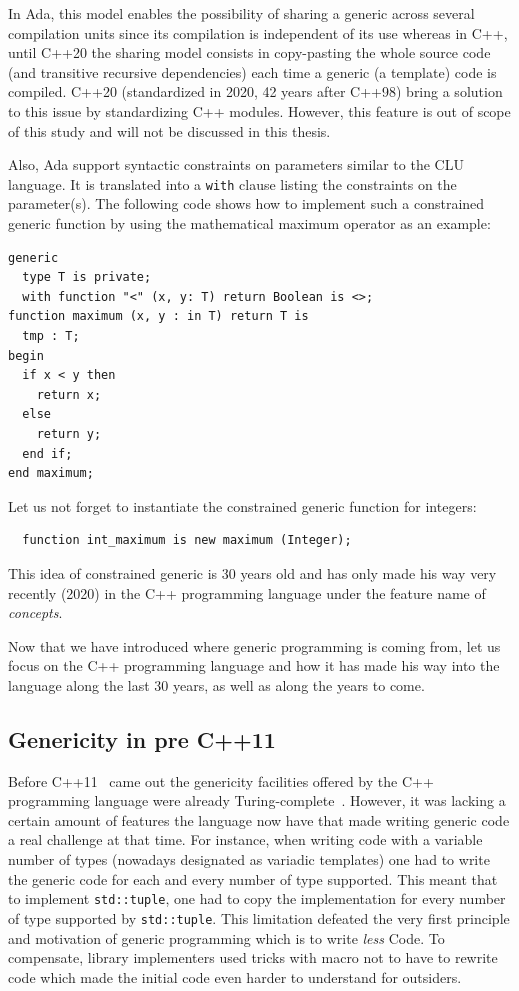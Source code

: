 In Ada, this model enables the possibility of sharing a generic across several compilation units since its compilation is
independent of its use whereas in C++, until C++20 the sharing model consists in copy-pasting the whole source code
(and transitive recursive dependencies) each time a generic (a template) code is compiled. C++20 (standardized in 2020,
42 years after C++98) bring a solution to this issue by standardizing C++ modules. However, this feature is out of scope
of this study and will not be discussed in this thesis.

Also, Ada support syntactic constraints on parameters similar to the CLU language. It is translated into a \texttt{with}
clause listing the constraints on the parameter(s). The following code shows how to implement such a constrained generic
function by using the mathematical maximum operator as an example:

\begin{verbatim}
generic
  type T is private;
  with function "<" (x, y: T) return Boolean is <>;
function maximum (x, y : in T) return T is
  tmp : T;
begin
  if x < y then
    return x;
  else
    return y;
  end if;
end maximum;
\end{verbatim}

Let us not forget to instantiate the constrained generic function for integers:

\begin{verbatim}
  function int_maximum is new maximum (Integer);
\end{verbatim}

This idea of constrained generic is 30 years old and has only made his way very recently (2020) in the C++ programming
language under the feature name of \emph{concepts}.

Now that we have introduced where generic programming is coming from, let us focus on the C++ programming language and
how it has made his way into the language along the last 30 years, as well as along the years to come.

\subsection{Genericity in pre C++11}
\label{sec:precpp11}

Before C++11~\parencite{iso.2011.cpp} came out the genericity facilities offered by the C++ programming language were
already Turing-complete~\parencite{veldhuizen.2003.c++templates}. However, it was lacking a certain amount of features
the language now have that made writing generic code a real challenge at that time. For instance, when writing code with
a variable number of types (nowadays designated as variadic templates) one had to write the generic code for each and
every number of type supported. This meant that to implement \texttt{std::tuple}, one had to copy the implementation for
every number of type supported by \texttt{std::tuple}. This limitation defeated the very first principle and motivation
of generic programming which is to write \emph{less} Code. To compensate, library implementers used tricks with macro
not to have to rewrite code which made the initial code even harder to understand for outsiders.


